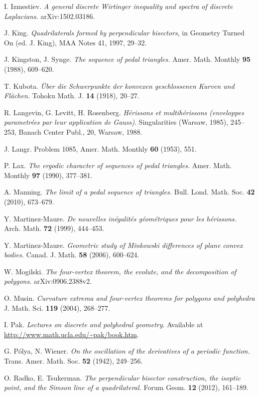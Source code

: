 \documentclass[12pt]{article}
\begin{document}
\begin{thebibliography}{99}
 I. Izmestiev. {\it A general discrete Wirtinger inequality and spectra of discrete Laplacians.} arXiv:1502.03186.

 J. King. {\it Quadrilaterals formed by perpendicular bisectors}, in Geometry Turned On (ed. J. King), MAA Notes 41, 1997, 29--32.

 J.  Kingston, J. Synge. {\it The sequence of pedal triangles.} Amer. Math. Monthly {\bf 95} (1988), 609--620.

 T. Kubota. {\it \"Uber die Schwerpunkte der konvexen geschlossenen Kurven und Fl\"achen.} Tohoku
Math. J. {\bf 14} (1918), 20--27.

 R. Langevin, G. Levitt, H. Rosenberg. {\it H\'erissons et multih\'erissons (enveloppes parametr\'ees par leur application de Gauss)}. Singularities (Warsaw, 1985), 245--253, Banach Center Publ., 20, Warsaw, 1988. 

 J. Langr. Problem 1085, Amer. Math. Monthly {\bf 60} (1953), 551.

 P. Lax. {\it The ergodic character of sequences of pedal triangles.} 
Amer. Math. Monthly {\bf 97} (1990), 377--381. 

 A. Manning.  {\it The limit of a pedal sequence of triangles.}
Bull. Lond. Math. Soc. {\bf 42} (2010), 673--679. 

 Y. Martinez-Maure. 
{\it De nouvelles in\'egalit\'es g\'eom\'etriques pour les h\'erissons.}
Arch. Math. {\bf 72} (1999),  444--453.

 Y. Martinez-Maure.
{\it Geometric study of Minkowski differences of plane convex bodies.}
Canad. J. Math. {\bf 58} (2006), 600--624. 

 W.  Mogilski. {\it The four-vertex theorem, the evolute, and the decomposition of polygons}. arXiv:0906.2388v2.

 O.  Musin. {\it Curvature extrema and four-vertex theorems for polygons and polyhedra} J. Math. Sci. {\bf 119} (2004), 268--277.

 I. Pak. {\it Lectures on discrete and polyhedral geometry}. Available at \url{http://www.math.ucla.edu/~pak/book.htm}.

 G. P\'olya, N. Wiener. {\it On the oscillation of the derivatives of a periodic function.} Trans. Amer. Math. Soc. {\bf 52} (1942), 249--256. 

 O. Radko, E. Tsukerman. {\it The perpendicular bisector construction, the isoptic point, and the Simson line of a quadrilateral.} Forum Geom. {\bf 12} (2012), 161--189.


\end{thebibliography}
\end{document}
